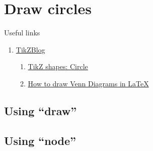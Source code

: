 \documentclass[12pt, letterpaper, oneside]{article}
\begin{document}
\section{Draw circles}

Useful links
\begin{enumerate}
  \item \href{https://latexdraw.com/}{TikZBlog}
    \begin{enumerate}
      \item \href{https://latexdraw.com/tikz-shapes-circle/}{TikZ shapes: Circle}
      \item \href{https://latexdraw.com/how-to-draw-venn-diagrams-in-latex/}{How to draw Venn Diagrams in LaTeX}
    \end{enumerate}
\end{enumerate}

\subsection{Using ``draw''}


\subsection{Using ``node''}
\end{document}
